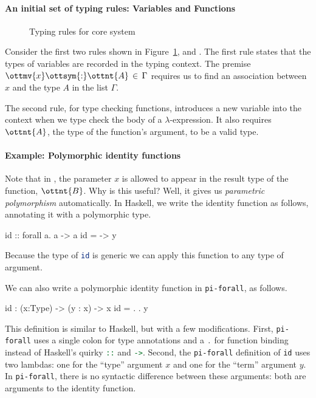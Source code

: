 \documentclass{article}
\newcommand\cd[1]{\lstinline[language=Haskell]{#1}}
\newcommand\pif{\texttt{pi-forall}\xspace}
\theoremstyle{definition}
\begin{document}
\paragraph{An initial set of typing rules: Variables and Functions}

\begin{figure}[t]
\caption{Typing rules for core system}
\label{fig:typing}
\end{figure}

Consider the first two rules shown in Figure~\ref{fig:typing}, 
and .  The first rule states that the types of variables are
recorded in the typing context. The premise $\ottmv{x}  \ottsym{:}  \ottnt{A} \, \in \, \Gamma$ requires us to
find an association between $x$ and the type $A$ in the list $\Gamma$.

The second rule, for type checking functions, introduces a new variable into
the context when we type check the body of a $\lambda$-expression. It also
requires $\ottnt{A}$, the type of the function's argument, to be a valid type.

\paragraph{Example: Polymorphic identity functions}

Note that in , the parameter $x$ is allowed to appear in the
result type of the function, $\ottnt{B}$. Why is this useful? Well, it gives us
\emph{parametric polymorphism} automatically.  In Haskell, we write the
identity function as follows, annotating it with a polymorphic type.

\begin{haskell}
id :: forall a. a -> a
id = \y -> y
\end{haskell}

\noindent
Because the type of \cd{id} is generic we can apply this function to any type of
argument.

We can also write a polymorphic identity function in \pif, as follows.
\begin{piforall}
id : (x:Type) -> (y : x) -> x
id = \x. \y. y
\end{piforall}

This definition is similar to Haskell, but with a few modifications. First,
\pif{} uses a single colon for type annotations and a \cd{.} for function
binding instead of Haskell's quirky \cd{::} and \cd{->}. Second, the \pif
definition of \texttt{id} uses two lambdas: one for the ``type'' argument $x$
and one for the ``term'' argument $y$. In \pif, there is no syntactic
difference between these arguments: both are arguments to the identity
function.
\end{document}
